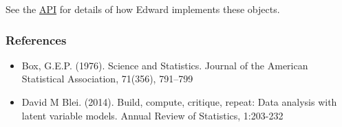 See the \href{api/index.html}{API} for details of how Edward implements these
objects.

\subsubsection{References}\label{references}

\begin{itemize}
\item
  Box, G.E.P. (1976). Science and Statistics. Journal of the American
  Statistical Association, 71(356), 791–799
\item
  David M Blei. (2014). Build, compute, critique, repeat: Data analysis with
  latent variable models. Annual Review of Statistics, 1:203-232
\end{itemize}
